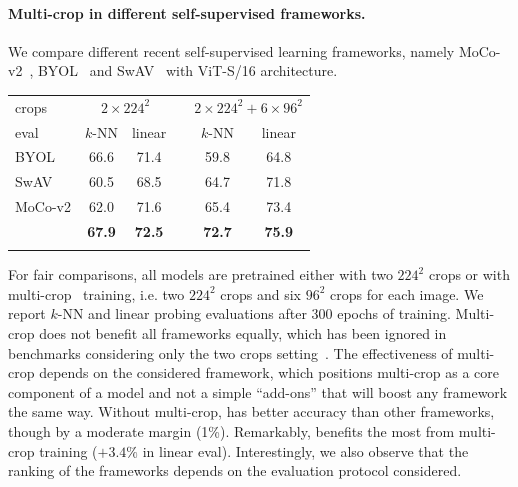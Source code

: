 \paragraph{Multi-crop in different self-supervised frameworks.}
We compare different recent self-supervised learning frameworks, namely MoCo-v2~\cite{chen2020improved}, BYOL~\cite{grill2020bootstrap} and SwAV~\cite{caron2020unsupervised} with ViT-S/16 architecture.
\begin{table}[h!]
\vspace{-0.8em}
  \centering
\begin{tabular}{@{}l cc c cc@{}}
\toprule
crops	& \multicolumn{2}{c}{$2 \times 224^2$} && \multicolumn{2}{c}{$2 \times 224^2 + 6 \times 96^2$} \\
    \cmidrule{2-3}
    \cmidrule{5-6}
	eval & $k$-NN & linear && $k$-NN & linear  \\
\midrule
	BYOL & 66.6 & 71.4 && 59.8 & 64.8 \\
	SwAV & 60.5 & 68.5 && 64.7 & 71.8 \\
	MoCo-v2 & 62.0 & 71.6 && 65.4 & 73.4 \\
        \rowcolor{Light}
	\OURS & \bf 67.9 & \bf 72.5 && \bf 72.7 & \bf 75.9 \\
\bottomrule
\vspace{-0.8em}
\end{tabular}
\end{table}
For fair comparisons, all models are pretrained either with two $224^2$ crops or with multi-crop~\cite{caron2020unsupervised} training, i.e. two $224^2$ crops and six $96^2$ crops for each image.
We report $k$-NN and linear probing evaluations after 300 epochs of training.
Multi-crop does not benefit all frameworks equally, which has been ignored in benchmarks considering only the two crops setting~\cite{chen2020exploring}.
The effectiveness of multi-crop depends on the considered framework, which positions multi-crop as a core component of a model and not a simple ``add-ons'' that will boost any framework the same way.
Without multi-crop, \OURS has better accuracy than other frameworks, though by a moderate margin (1\%).
Remarkably, \OURS benefits the most from multi-crop training ($+3.4\%$ in linear eval).
Interestingly, we also observe that the ranking of the frameworks depends on the evaluation protocol considered.

